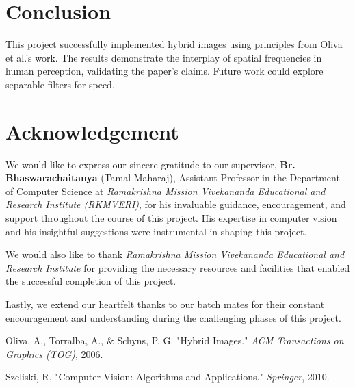 \documentclass[12pt]{report}
\begin{document}
\chapter{Conclusion}
This project successfully implemented hybrid images using principles from Oliva et al.’s \cite{oliva2006} work. The results demonstrate the interplay of spatial frequencies in human perception, validating the paper’s claims. Future work could explore separable filters for speed.


\chapter*{Acknowledgement}

We would like to express our sincere gratitude to our supervisor, \textbf{Br. Bhaswarachaitanya} (Tamal Maharaj), Assistant Professor in the Department of Computer Science at \textit{Ramakrishna Mission Vivekananda Educational and Research Institute (RKMVERI)}, for his invaluable guidance, encouragement, and support throughout the course of this project. His expertise in computer vision and his insightful suggestions were instrumental in shaping this project.

We would also like to thank \textit{Ramakrishna Mission Vivekananda Educational and Research Institute} for providing the necessary resources and facilities that enabled the successful completion of this project.

Lastly, we extend our heartfelt thanks to our batch mates for their constant encouragement and understanding during the challenging phases of this project.

\renewcommand{\bibname}{References}
\begin{thebibliography}{9}
  Oliva, A., Torralba, A., \& Schyns, P. G. "Hybrid Images." \textit{ACM Transactions on Graphics (TOG)}, 2006.

  Szeliski, R. "Computer Vision: Algorithms and Applications." \textit{Springer}, 2010.

\end{thebibliography}
\end{document}
